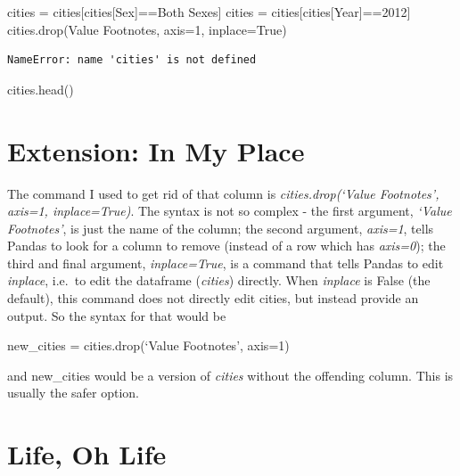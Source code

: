 \documentclass[
  letterpaper,
  DIV=11,
  numbers=noendperiod]{scrreprt}
\newenvironment{Shaded}{\begin{snugshade}}{\end{snugshade}}
\newcommand{\DecValTok}[1]{\textcolor[rgb]{0.68,0.00,0.00}{#1}}
\newcommand{\NormalTok}[1]{\textcolor[rgb]{0.00,0.23,0.31}{#1}}
\newcommand{\OperatorTok}[1]{\textcolor[rgb]{0.37,0.37,0.37}{#1}}
\newcommand{\StringTok}[1]{\textcolor[rgb]{0.13,0.47,0.30}{#1}}
\newcommand{\VariableTok}[1]{\textcolor[rgb]{0.07,0.07,0.07}{#1}}
\begin{document}
\begin{Shaded}
\begin{Highlighting}[]
\NormalTok{cities }\OperatorTok{=}\NormalTok{ cities[cities[}\StringTok{\textquotesingle{}Sex\textquotesingle{}}\NormalTok{]}\OperatorTok{==}\StringTok{\textquotesingle{}Both Sexes\textquotesingle{}}\NormalTok{]}
\NormalTok{cities }\OperatorTok{=}\NormalTok{ cities[cities[}\StringTok{\textquotesingle{}Year\textquotesingle{}}\NormalTok{]}\OperatorTok{==}\DecValTok{2012}\NormalTok{]}
\NormalTok{cities.drop(}\StringTok{\textquotesingle{}Value Footnotes\textquotesingle{}}\NormalTok{, axis}\OperatorTok{=}\DecValTok{1}\NormalTok{, inplace}\OperatorTok{=}\VariableTok{True}\NormalTok{)}
\end{Highlighting}
\end{Shaded}

\begin{verbatim}
NameError: name 'cities' is not defined
\end{verbatim}

\begin{Shaded}
\begin{Highlighting}[]
\NormalTok{cities.head()}
\end{Highlighting}
\end{Shaded}

\hypertarget{extension-in-my-place}{%
\section{Extension: In My Place}\label{extension-in-my-place}}

The command I used to get rid of that column is \emph{cities.drop(`Value
Footnotes', axis=1, inplace=True)}. The syntax is not so complex - the
first argument, \emph{`Value Footnotes'}, is just the name of the
column; the second argument, \emph{axis=1}, tells Pandas to look for a
column to remove (instead of a row which has \emph{axis=0}); the third
and final argument, \emph{inplace=True}, is a command that tells Pandas
to edit \emph{inplace}, i.e.~to edit the dataframe (\emph{cities})
directly. When \emph{inplace} is False (the default), this command does
not directly edit cities, but instead provide an output. So the syntax
for that would be

new\_cities = cities.drop(`Value Footnotes', axis=1)

and new\_cities would be a version of \emph{cities} without the
offending column. This is usually the safer option.

\hypertarget{life-oh-life}{%
\section{Life, Oh Life}\label{life-oh-life}}
\end{document}
